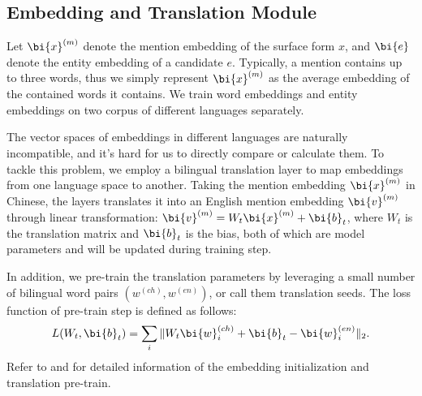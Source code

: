 \subsection{Embedding and Translation Module}
\label{sec:translation}

Let $\bi{x}^{(m)}$ denote the mention embedding of the surface form $x$,
and $\bi{e}$ denote the entity embedding of a candidate $e$.
Typically, a mention contains up to three words,
thus we simply represent $\bi{x}^{(m)}$ as the average embedding of the contained words it contains.
We train word embeddings and entity embeddings on two corpus of different languages separately.

The vector spaces of embeddings in different languages are naturally incompatible,
and it's hard for us to directly compare or calculate them.
To tackle this problem, we employ a bilingual translation layer
to map embeddings from one language space to another.
Taking the mention embedding $\bi{x}^{(m)}$ in Chinese,
the layers translates it into an English mention embedding $\bi{v}^{(m)}$ through linear transformation:
$\bi{v}^{(m)}=W_t \bi{x}^{(m)} + \bi{b}_t$, where $W_t$ is the translation matrix and $\bi{b}_t$ is the bias,
both of which are model parameters
and will be updated during training step.

In addition, we pre-train the translation parameters by leveraging a small number of
bilingual word pairs $(w^{(ch)}, w^{(en)})$, or call them translation seeds.
The loss function of pre-train step is defined as follows:
\begin{equation}
\label{eqn:translation}
L(W_{t}, \bi{b}_{t}) = \sum_i \Arrowvert W_{t} \bi{w}_i^{(ch)} + \bi{b}_{t} - \bi{w}_i^{(en)} \Arrowvert_2.
\end{equation}
Refer to  and 
for detailed information of the embedding initialization and translation pre-train.


